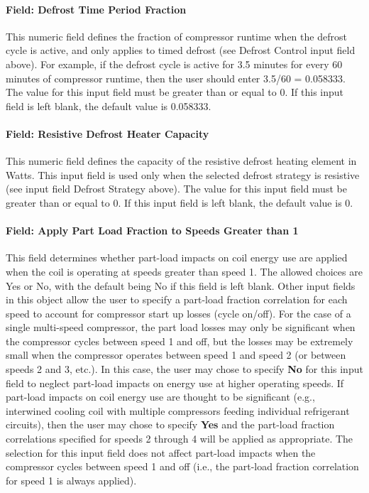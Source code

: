 \paragraph{Field: Defrost Time Period Fraction}\label{field-defrost-time-period-fraction-1}

This numeric field defines the fraction of compressor runtime when the defrost cycle is active, and only applies to timed defrost (see Defrost Control input field above). For example, if the defrost cycle is active for 3.5 minutes for every 60 minutes of compressor runtime, then the user should enter 3.5/60 = 0.058333. The value for this input field must be greater than or equal to 0. If this input field is left blank, the default value is 0.058333.

\paragraph{Field: Resistive Defrost Heater Capacity}\label{field-resistive-defrost-heater-capacity-1}

This numeric field defines the capacity of the resistive defrost heating element in Watts. This input field is used only when the selected defrost strategy is resistive (see input field Defrost Strategy above). The value for this input field must be greater than or equal to 0. If this input field is left blank, the default value is 0.

\paragraph{Field: Apply Part Load Fraction to Speeds Greater than 1}\label{field-apply-part-load-fraction-to-speeds-greater-than-1-1}

This field determines whether part-load impacts on coil energy use are applied when the coil is operating at speeds greater than speed 1. The allowed choices are Yes or No, with the default being No if this field is left blank. Other input fields in this object allow the user to specify a part-load fraction correlation for each speed to account for compressor start up losses (cycle on/off). For the case of a single multi-speed compressor, the part load losses may only be significant when the compressor cycles between speed 1 and off, but the losses may be extremely small when the compressor operates between speed 1 and speed 2 (or between speeds 2 and 3, etc.). In this case, the user may chose to specify \textbf{No} for this input field to neglect part-load impacts on energy use at higher operating speeds. If part-load impacts on coil energy use are thought to be significant (e.g., interwined cooling coil with multiple compressors feeding individual refrigerant circuits), then the user may chose to specify \textbf{Yes} and the part-load fraction correlations specified for speeds 2 through 4 will be applied as appropriate. The selection for this input field does not affect part-load impacts when the compressor cycles between speed 1 and off (i.e., the part-load fraction correlation for speed 1 is always applied).

